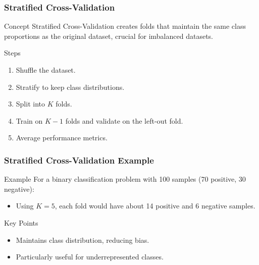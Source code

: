 \documentclass[aspectratio=169]{beamer}
\begin{document}
\begin{frame}
    \frametitle{Stratified Cross-Validation}
    \begin{block}{Concept}
        Stratified Cross-Validation creates folds that maintain the same class proportions as the original dataset, crucial for imbalanced datasets.
    \end{block}

    \begin{block}{Steps}
        \begin{enumerate}
            \item Shuffle the dataset.
            \item Stratify to keep class distributions.
            \item Split into \(K\) folds.
            \item Train on \(K-1\) folds and validate on the left-out fold.
            \item Average performance metrics.
        \end{enumerate}
    \end{block}
\end{frame}

\begin{frame}
    \frametitle{Stratified Cross-Validation Example}
    \begin{block}{Example}
        For a binary classification problem with 100 samples (70 positive, 30 negative):
        \begin{itemize}
            \item Using \(K=5\), each fold would have about 14 positive and 6 negative samples.
        \end{itemize}
    \end{block}
    
    \begin{block}{Key Points}
        \begin{itemize}
            \item Maintains class distribution, reducing bias.
            \item Particularly useful for underrepresented classes.
        \end{itemize}
    \end{block}
\end{frame}
\end{document}
